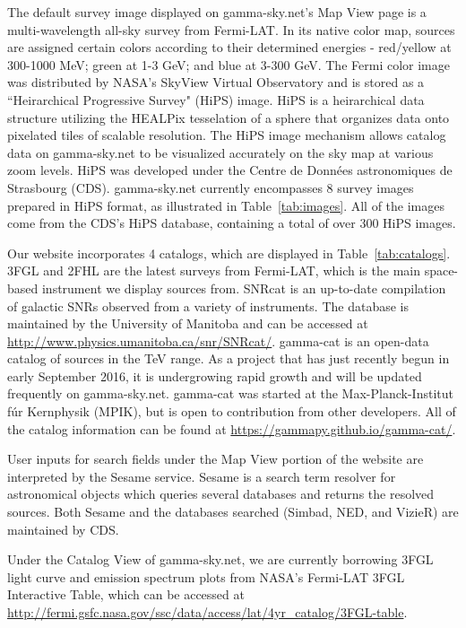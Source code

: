 




    The default survey image displayed on gamma-sky.net's Map View page is a multi-wavelength all-sky survey from Fermi-LAT. In its native color map, sources are assigned certain colors according to their determined energies - red/yellow at 300-1000 MeV; green at 1-3 GeV; and blue at 3-300 GeV. The Fermi color image was distributed by NASA's SkyView Virtual Observatory and is stored as a ``Heirarchical Progressive Survey" (HiPS) image. HiPS is a heirarchical data structure utilizing the HEALPix tesselation of a sphere that organizes data onto pixelated tiles of scalable resolution. The HiPS image mechanism allows catalog data on gamma-sky.net to be visualized accurately on the sky map at various zoom levels. HiPS was developed under the Centre de Donn\'{e}es astronomiques de Strasbourg (CDS). gamma-sky.net currently encompasses 8 survey images prepared in HiPS format, as illustrated in Table~\ref{tab:images}. All of the images come from the CDS's HiPS database, containing a total of over 300 HiPS images.

    Our website incorporates 4 catalogs, which are displayed in Table~\ref{tab:catalogs}. 3FGL and 2FHL are the latest surveys from Fermi-LAT, which is the main space-based instrument we display sources from. SNRcat is an up-to-date compilation of galactic SNRs observed from a variety of instruments. The database is maintained by the University of Manitoba and can be accessed at \url{http://www.physics.umanitoba.ca/snr/SNRcat/}. gamma-cat is an open-data catalog of sources in the TeV range. As a project that has just recently begun in early September 2016, it is undergrowing rapid growth and will be updated frequently on gamma-sky.net. gamma-cat was started at the Max-Planck-Institut f\'{u}r Kernphysik (MPIK), but is open to contribution from other developers. All of the catalog information can be found at \url{https://gammapy.github.io/gamma-cat/}.

    User inputs for search fields under the Map View portion of the website are interpreted by the Sesame service. Sesame is a search term resolver for astronomical objects which queries several databases and returns the resolved sources. Both Sesame and the databases searched (Simbad, NED, and VizieR) are maintained by CDS.

    Under the Catalog View of gamma-sky.net, we are currently borrowing 3FGL light curve and emission spectrum plots from NASA's Fermi-LAT 3FGL Interactive Table, which can be accessed at \url{http://fermi.gsfc.nasa.gov/ssc/data/access/lat/4yr_catalog/3FGL-table}.
